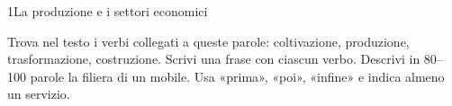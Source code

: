 \begin{lettura}{1}{La produzione e i settori economici}




\lingua
Trova nel testo i verbi collegati a queste parole: coltivazione, produzione, trasformazione, costruzione. Scrivi una frase con ciascun verbo.
\scrittura
Descrivi in 80--100 parole la filiera di un mobile. Usa «prima», «poi», «infine» e indica almeno un servizio.

\end{lettura}


